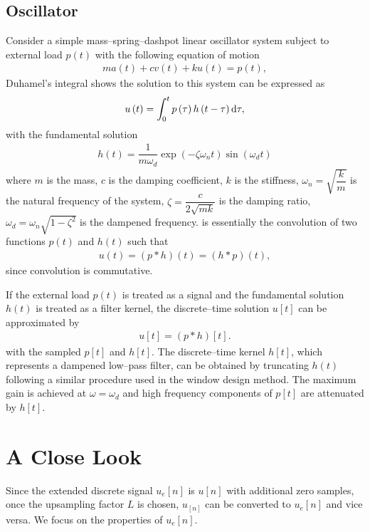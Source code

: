 \subsection{Oscillator}
Consider a simple mass--spring--dashpot linear oscillator system subject to external load $p\left(t\right)$ with the following equation of motion
\begin{gather}
ma\left(t\right)+cv\left(t\right)+ku\left(t\right)=p\left(t\right),
\end{gather}
Duhamel's integral shows the solution to this system can be expressed as
\begin{gather}\label{eq:duhamel}
u\left(t\right)=\int_{0}^{t}p\left(\tau\right)h\left(t-\tau\right)\mathrm{d}\tau,
\end{gather}
with the fundamental solution
\begin{gather}
h\left(t\right)=\dfrac{1}{m\omega_d}\exp\left(-\zeta\omega_nt\right)\sin\left(\omega_dt\right)
\end{gather}
where $m$ is the mass, $c$ is the damping coefficient, $k$ is the stiffness, $\omega_n=\sqrt{\dfrac{k}{m}}$ is the natural frequency of the system, $\zeta=\dfrac{c}{2\sqrt{mk}}$ is the damping ratio, $\omega_d=\omega_n\sqrt{1-\zeta^2}$ is the dampened frequency.  is essentially the convolution of two functions $p\left(t\right)$ and $h\left(t\right)$ such that
\begin{gather}
u\left(t\right)=\left(p\ast{}h\right)\left(t\right)=\left(h\ast{}p\right)\left(t\right),
\end{gather}
since convolution is commutative.

If the external load $p\left(t\right)$ is treated as a signal and the fundamental solution $h\left(t\right)$ is treated as a filter kernel, the discrete--time solution $u[t]$ can be approximated by
\begin{gather}
u[t]=\left(p\ast{}h\right)[t].
\end{gather}
with the sampled $p[t]$ and $h[t]$. The discrete--time kernel $h[t]$, which represents a dampened low--pass filter, can be obtained by truncating $h\left(t\right)$ following a similar procedure used in the window design method. The maximum gain is achieved at $\omega=\omega_d$ and high frequency components of $p[t]$ are attenuated by $h[t]$.
\section{A Close Look}
Since the extended discrete signal $u_e[n]$ is $u[n]$ with additional zero samples, once the upsampling factor $L$ is chosen, $u_[n]$ can be converted to $u_e[n]$ and vice versa. We focus on the properties of $u_e[n]$.

